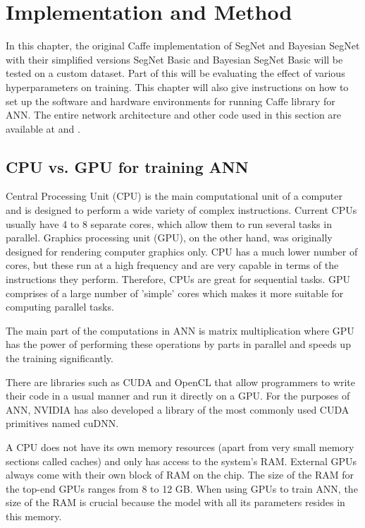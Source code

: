 \chapter{Implementation and Method}

In this chapter, the original Caffe implementation of SegNet and Bayesian SegNet with their simplified versions SegNet Basic and Bayesian SegNet Basic will be tested on a custom dataset. Part of this will be evaluating the effect of various hyperparameters on training. This chapter will also give instructions on how to set up the software and hardware environments for running Caffe library for ANN. The entire network architecture and other code used in this section are available at \cite{filip_github} and \cite{filip_github_caffe}.

\section{CPU vs. GPU for training ANN}

Central Processing Unit (CPU) is the main computational unit of a computer and is designed to perform a wide variety of complex instructions. Current CPUs usually have 4 to 8 separate cores, which allow them to run several tasks in parallel. Graphics processing unit (GPU), on the other hand, was originally designed for rendering computer graphics only. CPU has a much lower number of cores, but these run at a high frequency and are very capable in terms of the instructions they perform. Therefore, CPUs are great for sequential tasks. GPU comprises of a large number of 'simple' cores which makes it more suitable for computing parallel tasks. \cite{stanford-L8}

The main part of the computations in ANN is matrix multiplication where GPU has the power of performing these operations by parts in parallel and speeds up the training significantly. \cite{stanford-L8}

There are libraries such as CUDA and OpenCL that allow programmers to write their code in a usual manner and run it directly on a GPU. For the purposes of ANN, NVIDIA has also developed a library of the most commonly used CUDA primitives named cuDNN. \cite{stanford-L8}
 
A CPU does not have its own memory resources (apart from very small memory sections called caches) and only has access to the system's RAM. External GPUs always come with their own block of RAM on the chip. The size of the RAM for the top-end GPUs ranges from 8 to 12 GB. When using GPUs to train ANN, the size of the RAM is crucial because the model with all its parameters resides in this memory. 

